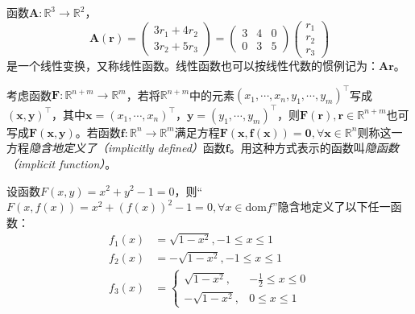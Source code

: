 \documentclass[main.tex]{subfiles}
\begin{document}
\begin{example}\label{exp:II.4.2}
    函数$\mathbf{A}:\mathbb{R}^3\rightarrow\mathbb{R}^2$，
    \[\mathbf{A}\left(\mathbf{r}\right)=\left(\begin{array}{c}3r_1+4r_2\\3r_2+5r_3\end{array}\right)=\left(\begin{array}{ccc}3&4&0\\0&3&5\end{array}\right)\left(\begin{array}{c}r_1\\r_2\\r_3\end{array}\right)\]
    是一个线性变换，又称线性函数。线性函数也可以按线性代数的惯例记为：$\mathbf{Ar}$。
\end{example}

\begin{definition}[隐函数]\label{def:II.4.2}
    考虑函数$\mathbf{F}:\mathbb{R}^{n+m}\rightarrow\mathbb{R}^m$，若将$\mathbb{R}^{n+m}$中的元素$\left(x_1,\cdots,x_n,y_1,\cdots,y_m\right)^\intercal$写成$\left(\mathbf{x},\mathbf{y}\right)^\intercal$，其中$\mathbf{x}=\left(x_1,\cdots,x_n\right)^\intercal$，$\mathbf{y}=\left(y_1,\cdots,y_m\right)^\intercal$，则$\mathbf{F}\left(\mathbf{r}\right),\mathbf{r}\in\mathbb{R}^{n+m}$也可写成$\mathbf{F}\left(\mathbf{x},\mathbf{y}\right)$。若函数$\mathbf{f}:\mathbb{R}^n\rightarrow\mathbb{R}^m$满足方程$\mathbf{F}\left(\mathbf{x},\mathbf{f}\left(\mathbf{x}\right)\right)=\mathbf{0},\forall\mathbf{x}\in\mathbb{R}^n$则称这一方程\emph{隐含地定义了（implicitly defined）}函数$\mathbf{f}$。用这种方式表示的函数叫\emph{隐函数（implicit function）}。
\end{definition}

\begin{example}\label{exp:II.4.3}
    设函数$F\left(x,y\right)=x^2+y^2-1=0$，则“$F\left(x,f\left(x\right)\right)=x^2+\left(f\left(x\right)\right)^2-1=0,\forall x\in\mathrm{dom}f$”隐含地定义了以下任一函数：
    \begin{align*}
        f_1\left(x\right) & =\sqrt{1-x^2},-1\leq x\leq 1                      \\
        f_2\left(x\right) & =-\sqrt{1-x^2},-1\leq x\leq 1                     \\
        f_3\left(x\right) & =\left\{\begin{array}{ll}
                                        \sqrt{1-x^2},  & -\frac{1}{2}\leq x\leq 0 \\
                                        -\sqrt{1-x^2}, & 0\leq x\leq 1
                                    \end{array}\right.
    \end{align*}
\end{example}
\end{document}
